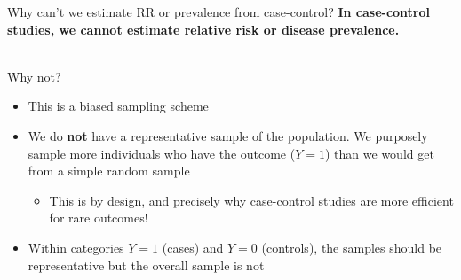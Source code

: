 \documentclass[10pt,t]{beamer}
\begin{document}
\begin{frame}{Why can't we estimate RR or prevalence from case-control?}
	\textbf{In case-control studies, we cannot estimate relative risk or disease prevalence.}
	\\ ~\
	
	Why not? 
	\medskip
	
	\begin{itemize}
		\item This is a biased sampling scheme
		\medskip
		
		\item We do \textbf{not} have a representative sample of the population. We purposely sample more individuals who have the outcome ($Y = 1$) than we would 
		get from a simple random sample
		\medskip
			\begin{itemize}
				\item This is by design, and precisely why case-control studies are more efficient for rare outcomes!
			\end{itemize}
		
		\medskip
		
		\item Within categories $Y = 1$ (cases) and $Y = 0$ (controls), the samples should be representative but the overall sample is not
	\end{itemize} 
\end{frame}
\end{document}
